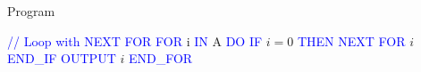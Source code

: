 \documentclass{article}
\begin{document}
\begin{algorithm}
\caption{Program}
\begin{algorithmic}[1]
\STATE \textcolor [HTML]{0000FF}{// Loop with NEXT FOR}
\STATE \textcolor [HTML]{0000FF}{FOR} i \textcolor [HTML]{0000FF}{IN} A \textcolor [HTML]{0000FF}{DO}
\STATE \textcolor [HTML]{0000FF}{IF} $i = 0$ \textcolor [HTML]{0000FF}{THEN}
\STATE \textcolor [HTML]{0000FF}{NEXT} \textcolor [HTML]{0000FF}{FOR} $i$
\STATE \textcolor [HTML]{0000FF}{END\_IF}
\STATE \textcolor [HTML]{0000FF}{OUTPUT} $i$
\STATE \textcolor [HTML]{0000FF}{END\_FOR}
\end{algorithmic}
\end{algorithm}
\end{document}
